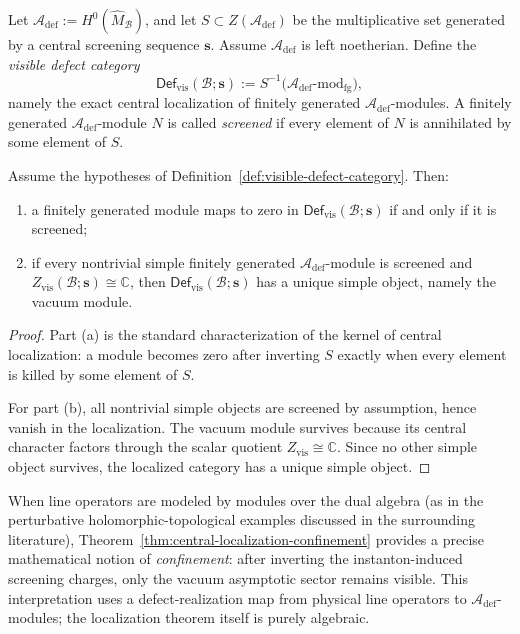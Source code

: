\begin{definition}
\label{def:visible-defect-category}
Let $\mathcal A_{\mathrm{def}}:=H^0(\widehat M_{\mathcal B})$, and let $S\subset Z(\mathcal A_{\mathrm{def}})$ be the
multiplicative set generated by a central screening sequence $\mathbf s$.
Assume $\mathcal A_{\mathrm{def}}$ is left noetherian.
Define the \emph{visible defect category}
\[
\mathsf{Def}_{\mathrm{vis}}(\mathcal B;\mathbf s)
:=S^{-1}\bigl(\mathcal A_{\mathrm{def}}\text{-}\mathrm{mod}_{\mathrm{fg}}\bigr),
\]
namely the exact central localization of finitely generated $\mathcal A_{\mathrm{def}}$-modules.
A finitely generated $\mathcal A_{\mathrm{def}}$-module $N$ is called \emph{screened} if every element of $N$
is annihilated by some element of $S$.
\end{definition}

\begin{theorem}
\label{thm:central-localization-confinement}
Assume the hypotheses of Definition~\ref{def:visible-defect-category}.
Then:
\begin{enumerate}[label=(\alph*)]
\item a finitely generated module maps to zero in $\mathsf{Def}_{\mathrm{vis}}(\mathcal B;\mathbf s)$ if and only if it is screened;
\item if every nontrivial simple finitely generated $\mathcal A_{\mathrm{def}}$-module is screened and
$Z_{\mathrm{vis}}(\mathcal B;\mathbf s)\cong \mathbb C$, then $\mathsf{Def}_{\mathrm{vis}}(\mathcal B;\mathbf s)$ has a unique simple object,
namely the vacuum module.
\end{enumerate}
\end{theorem}

\begin{proof}
Part (a) is the standard characterization of the kernel of central localization: a module becomes zero after
inverting $S$ exactly when every element is killed by some element of $S$.

For part (b), all nontrivial simple objects are screened by assumption, hence vanish in the localization.
The vacuum module survives because its central character factors through the scalar quotient
$Z_{\mathrm{vis}}\cong \mathbb C$. Since no other simple object survives, the localized category has a unique
simple object.
\end{proof}

\begin{remark}
\label{rem:physical-interpretation-confinement}
When line operators are modeled by modules over the dual algebra (as in the perturbative holomorphic-topological
examples discussed in the surrounding literature), Theorem~\ref{thm:central-localization-confinement}
provides a precise mathematical notion of \emph{confinement}: after inverting the instanton-induced screening
charges, only the vacuum asymptotic sector remains visible.
This interpretation uses a defect-realization map from physical line operators to
$\mathcal A_{\mathrm{def}}$-modules; the localization theorem itself is purely algebraic.
\end{remark}

